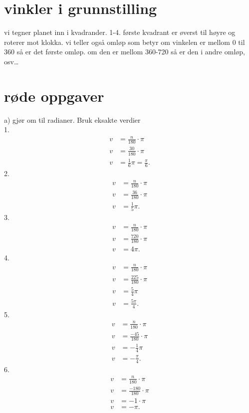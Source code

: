 \documentclass{report}
\begin{document}
\section{vinkler i grunnstilling}
vi tegner planet inn i kvadrander. 1-4. første kvadrant er øverst til høyre og roterer mot klokka. vi teller også omløp som betyr om vinkelen er mellom 0 til 360 så er det første omløp. om den er mellom 360-720 så er den i andre omløp, osv\ldots
\section{røde oppgaver}
a) gjør om til radianer. Bruk eksakte verdier\\
1.
\begin{align*}
	v &= \frac{n}{180} \cdot \pi\\
	v &= \frac{30}{180}\cdot \pi\\
	v &= \frac{1}{6}\pi = \frac{\pi}{6}
.\end{align*}
2.
\begin{align*}
	v &= \frac{n}{180}\cdot \pi\\
	v &= \frac{36}{180}\cdot \pi\\
	v &= \frac{1}{5}\pi
.\end{align*}
3.
\begin{align*}
	v &= \frac{n}{180}\cdot \pi\\
	v &= \frac{720}{180}\cdot\pi\\
	v &= 4\pi
.\end{align*}
4.
\begin{align*}
	v &= \frac{n}{180}\cdot\pi\\
	v &= \frac{225}{180}\cdot\pi\\
	v &= \frac{5}{4}\pi\\
	v &= \frac{5\pi}{4}
.\end{align*}
5.
\begin{align*}
	v &= \frac{n}{180}\cdot\pi\\
	v &= \frac{-45}{180}\cdot\pi\\
	v &= -\frac{1}{4}\pi\\
	v &= -\frac{\pi}{4}
.\end{align*}
6.
\begin{align*}
	v &= \frac{n}{180}\cdot\pi\\
	v &= \frac{-180}{180}\cdot\pi\\
	v &= -1 \cdot\pi\\
	v &= -\pi
.\end{align*}
\end{document}
